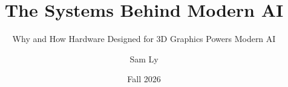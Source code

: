 \documentclass{beamer}
\title{The Systems Behind Modern AI}
\subtitle{Why and How Hardware Designed for 3D Graphics Powers Modern AI}
\author{Sam Ly}
\institute{Cal Poly Pomona}
\date{Fall 2026}
\begin{document}
\frame{\titlepage}







\end{document}
